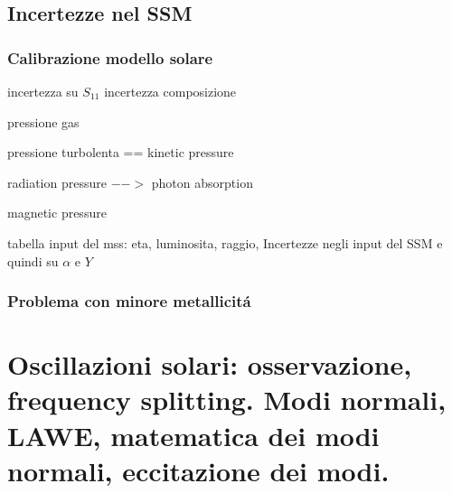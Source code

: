 \documentclass[../main.tex]{subfiles}
\begin{document}
\begin{refsection}

\nocite{*}

\section{Incertezze nel SSM}

\begingroup
\let\clearpage\relax

\printbibliography[filter=ssmunphys,keyword={rev},title={\textcolor{ochre}{Biblio about: ''Incertezze nei parametri e nella fisica usata nel SSM''}}]
\printbibliography[filter=ssmunphys,notkeyword={rev},title={\textcolor{ochre}{Other refs about: ''Incertezze nei parametri e nella fisica usata nel SSM''}}]
\endgroup

\subsection{Calibrazione modello solare}

incertezza su $S_{11}$
incertezza composizione
\begin{itemize*}
\item pressione gas
\item pressione turbolenta == kinetic pressure
\item radiation pressure $-->$ photon absorption
\item magnetic pressure
\end{itemize*}
tabella input del mss: eta, luminosita, raggio,
Incertezze negli input del SSM e quindi su $\alpha$ e $Y$

\subsection{Problema con minore metallicit\'a}

\end{refsection}


{\let\clearpage\relax
\chapter{Oscillazioni solari: osservazione, frequency splitting. Modi normali, LAWE, matematica dei modi normali, eccitazione dei modi.}}
\PartialToc
\end{document}
